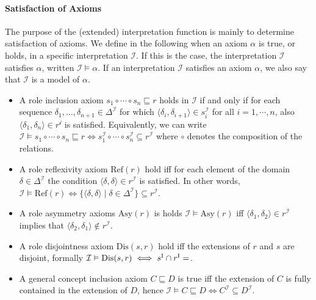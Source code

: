 \paragraph{Satisfaction of Axioms} \label{satisfaction-of-axioms}

The purpose of the (extended) interpretation function is mainly to determine satisfaction of axioms. We define in the following when an axiom $\alpha$ is true, or holds, in a specific interpretation $\mathcal{I}$. If this is the case, the interpretation $\mathcal{I}$ satisfies $\alpha$, written $\mathcal{I} \vDash \alpha$. If an interpretation $\mathcal{I}$ satisfies an axiom $\alpha$, we also say that $\mathcal{I}$ is a model of $\alpha$.

\begin{itemize}
    \item A role inclusion axiom $s_1 \circ \cdots \circ s_n \sqsubseteq r$ holds in $\mathcal{I}$ if and only if for each sequence $\delta_1, \dots, \delta_{n + 1} \in \Delta^\mathcal{I}$ for which $\langle \delta_i , \delta_{i + 1} \rangle \in s_i^\mathcal{I}$ for all $i = 1, \cdots, n$, also $\langle \delta_1 , \delta_n \rangle \in r^\mathcal{i}$ is satisfied. Equivalently, we can write $\mathcal{I} \vDash s_1 \circ \cdots \circ s_n \sqsubseteq r \iff s_1^\mathcal{I} \circ \cdots \circ s_n^\mathcal{I} \subseteq r^\mathcal{I}$ where $\circ$ denotes the composition of the relations.
    \item A role reflexivity axiom $\mathrm{Ref}(r)$ hold iff for each element of the domain $\delta \in \Delta^\mathcal{I}$ the condition $\langle \delta , \delta \rangle \in r^\mathcal{I}$ is satisfied. In other words, $\mathcal{I} \vDash \mathrm{Ref}(r) \iff \{ \langle \delta, \delta \rangle \mid \delta \in \Delta^\mathcal{I} \} \subseteq r^\mathcal{I}$.
    \item A role asymmetry axioms $\mathrm{Asy}(r)$ is holds $\mathcal{I} \vDash \mathrm{Asy}(r)$ iff $\langle \delta_1 , \delta_2 \rangle \in r^\mathcal{I}$ implies that $\langle \delta_2, \delta_1 \rangle \not\in r^\mathcal{I}$.
    \item A role disjointness axiom $\mathrm{Dis}(s, r)$ hold iff the extensions of $r$ and $s$ are disjoint, formally $\mathcal{I} \vDash \mathrm{Dis}(s, r) \iff s^\mathrm{I} \cap r^\mathrm{I} = \empty$.
    \item A general concept inclusion axiom $C \sqsubseteq D$ is true iff the extension of $C$ is fully contained in the extension of $D$, hence $\mathcal{I} \vDash C \sqsubseteq D \iff C^\mathcal{I} \subseteq D^\mathcal{I}$.

\end{itemize}
